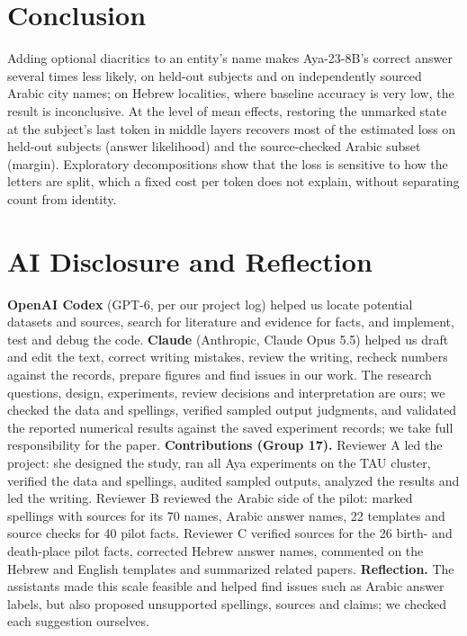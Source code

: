 \documentclass[11pt]{article}
\begin{document}
\section{Conclusion}
Adding optional diacritics to an entity's name makes Aya-23-8B's correct answer
several times less likely, on held-out subjects and on independently sourced
Arabic city names; on Hebrew localities, where
baseline accuracy is very low, the result is inconclusive. At the level of mean
effects, restoring the unmarked state at the subject's last token in middle
layers recovers most of the estimated loss on held-out subjects (answer
likelihood) and the source-checked Arabic subset (margin). Exploratory decompositions show that the loss is sensitive to how the letters are split, which a fixed cost per token does not explain, without separating count from identity.

\section*{AI Disclosure and Reflection}
\textbf{OpenAI Codex} (GPT-6, per our project
log) helped us locate potential datasets and sources, search for literature and
evidence for facts, and implement, test and debug the code. \textbf{Claude} (Anthropic, Claude
Opus 5.5) helped us draft and edit the text, correct writing mistakes, review the
writing, recheck numbers against the records, prepare figures and find issues in
our work. The
research questions, design, experiments, review decisions and interpretation are
ours; we checked the data and spellings, verified sampled output judgments,
and validated the reported numerical results against the saved experiment
records; we take full responsibility for the paper.
\textbf{Contributions (Group 17).} Reviewer A led the project: she designed the
study, ran all Aya experiments on the TAU cluster, verified the data and spellings, audited sampled outputs, analyzed the results and led the writing. Reviewer B reviewed the
Arabic side of the pilot: marked spellings with sources for its 70 names, Arabic
answer names, 22 templates and source checks for 40 pilot facts. Reviewer C
verified sources for the 26 birth- and death-place pilot facts, corrected
Hebrew answer names, commented on the Hebrew and English templates and summarized
related papers.
\textbf{Reflection.} The assistants made this scale feasible and helped find
issues such as Arabic answer labels, but also proposed unsupported spellings, sources
and claims; we checked each suggestion ourselves.
\end{document}
